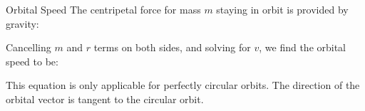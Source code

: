 \documentclass[12pt,compress,aspectratio=169]{beamer}
\begin{document}
%    



\begin{frame}{Orbital Speed}
  The centripetal force for mass $m$ staying in orbit is provided by gravity:


  \vspace{-.05in}Cancelling $m$ and $r$ terms on both sides, and solving for
  $v$, we find the orbital speed to be:


  This equation is only applicable for perfectly circular orbits. The direction
  of the orbital vector is tangent to the circular orbit.
\end{frame}
\end{document}
